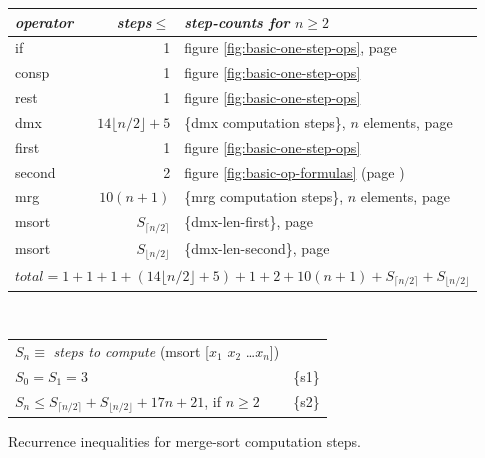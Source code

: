 \begin{figure}
\begin{center}
\begin{spacing}{0.9}
\begin{tabular}{lrl}
  \emph{operator} & \emph{steps}$\leq$ & \emph{step-counts for} $n \geq 2$\\
  \hline
   \textsf{if}     & 1 & figure \ref{fig:basic-one-step-ops}, page \pageref{fig:basic-one-step-ops}  \\
   \textsf{consp}  & 1 & figure \ref{fig:basic-one-step-ops}  \\
   \textsf{rest}   & 1 & figure \ref{fig:basic-one-step-ops} \\
   \textsf{dmx}    & $14\lfloor n/2\rfloor + 5$ & \{dmx computation steps\}, $n$ elements, page \pageref{fig:dmx-computation-time}\\
   \textsf{first}  & 1 & figure \ref{fig:basic-one-step-ops} \\
   \textsf{second} & 2 & figure \ref{fig:basic-op-formulas} (page \pageref{fig:basic-op-formulas}) \\
   \textsf{mrg}    & $10(n+1)$ & \{mrg computation steps\}, $n$ elements, page \pageref{thm:mrg-computation-time}\\
   \textsf{msort}  & $S_{\lceil  n/2 \rceil}$  & \{dmx-len-first\}, page \pageref{thm:dmx-length-first-second} \\
   \textsf{msort}  & $S_{\lfloor n/2 \rfloor}$ & \{dmx-len-second\}, page \pageref{thm:dmx-length-first-second} \vspace{5pt} \\
   \hline
	\multicolumn{3}{c}{$total = 1+1+1+(14\lfloor n/2\rfloor+5)+1+2+10(n+1)+S_{\lceil n/2\rceil}+S_{\lfloor n/2\rfloor}$} \vspace{1pt} \\
   \hline
\end{tabular}
\end{spacing}
~\vspace{2mm}\\
\begin{tabular}{ll}
   $S_n \equiv$ \emph{steps to compute} \textsf{(msort [$x_1$ $x_2$ \dots $x_n$])} \\
   $S_0 = S_1 = 3$ & \{s1\}\\
   $S_{n} \leq S_{\lceil n/2 \rceil} + S_{\lfloor n/2 \rfloor} + 17n + 21$, if $n \geq 2$ & \{s2\}\\
\end{tabular}
\end{center}
\caption{Recurrence inequalities for merge-sort computation steps.}
\label{msort-recurrences}
\end{figure}

